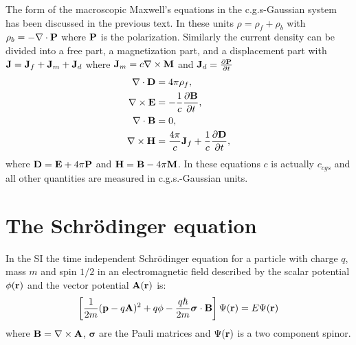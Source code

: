\documentclass[12pt,a4paper]{article}
\begin{document}
{\color{orange} The form of the macroscopic Maxwell's equations
in the c.g.s-Gaussian system has been discussed in the previous text.
In these units $\rho=\rho_f+\rho_b$ with $\rho_b=-\nabla \cdot {\bf P}$
where ${\bf P}$ is the polarization.
Similarly the current density can be divided into a free part, a 
magnetization part,
and a displacement part with ${\bf J}={\bf J}_f + {\bf J}_m + {\bf J}_d$ where
${\bf J}_m=c \nabla \times {\bf M}$ and ${\bf J}_d={\partial {\bf P}\over 
\partial t}$
\begin{align}
\nabla \cdot {\bf D} &= 4 \pi \rho_f, \\
\nabla \times {\bf E} &= -{1\over c} {\partial {\bf B} \over \partial t}, \\
\nabla \cdot {\bf B} &= 0, \\
\nabla \times {\bf H} &= {4 \pi \over c} {\bf J}_f+ {1\over c}
{\partial {\bf D} \over \partial t}, 
\end{align}
where ${\bf D}={\bf E} + 4 \pi {\bf P}$ and ${\bf H}={\bf B}- 4 \pi {\bf M}$.
In these equations $c$ is actually $c_{cgs}$ and all 
other quantities are measured in c.g.s.-Gaussian units.
}

\newpage
\section{\color{coral}The Schr\"odinger equation}
In the SI the time independent Schr\"odinger equation for a particle 
with charge $q$, mass $m$ and spin $1/2$ in an electromagnetic field 
described by the scalar potential $\phi({\bf r})$ and the vector
potential ${\bf A}({\bf r})$ is:
\begin{equation}
\left[{1\over 2m} ({\bf p}-q {\bf A})^2 + q \phi - 
{q \hbar \over 2 m} {\boldsymbol \sigma} \cdot {\bf B} \right]
\Psi({\bf r})=E \Psi({\bf r})
\end{equation}
where ${\bf B}=\nabla\times {\bf A}$, ${\boldsymbol \sigma}$ are the Pauli
matrices and $\Psi({\bf r})$ is a two component spinor.
\\
\end{document}
